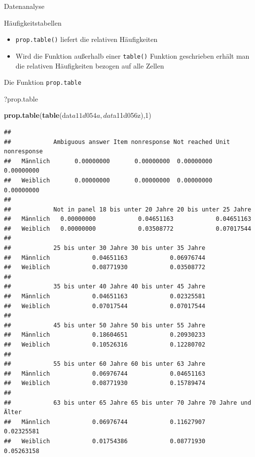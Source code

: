 \documentclass[ignorenonframetext,]{beamer}
\newenvironment{Shaded}{}{}
\newcommand{\KeywordTok}[1]{\textcolor[rgb]{0.00,0.44,0.13}{\textbf{{#1}}}}
\newcommand{\DecValTok}[1]{\textcolor[rgb]{0.25,0.63,0.44}{{#1}}}
\newcommand{\NormalTok}[1]{{#1}}
\providecommand{\tightlist}{%
\setlength{\itemsep}{0pt}\setlength{\parskip}{0pt}}
\begin{document}
\begin{frame}[fragile]{Datenanalyse}
\begin{block}{Häufigkeitstabellen}
\begin{itemize}
\tightlist
\item
  \texttt{prop.table()} liefert die relativen Häufigkeiten
\item
  Wird die Funktion außerhalb einer \texttt{table()} Funktion
  geschrieben erhält man die relativen Häufigkeiten bezogen auf alle
  Zellen
\end{itemize}

\end{block}

\begin{block}{Die Funktion \texttt{prop.table}}

\begin{Shaded}
\begin{Highlighting}[]
\NormalTok{?prop.table}
\end{Highlighting}
\end{Shaded}

\begin{Shaded}
\begin{Highlighting}[]
\KeywordTok{prop.table}\NormalTok{(}\KeywordTok{table}\NormalTok{(dat$a11d054a,dat$a11d056z),}\DecValTok{1}\NormalTok{)}
\end{Highlighting}
\end{Shaded}

\begin{verbatim}
##           
##            Ambiguous answer Item nonresponse Not reached Unit nonresponse
##   Männlich       0.00000000       0.00000000  0.00000000       0.00000000
##   Weiblich       0.00000000       0.00000000  0.00000000       0.00000000
##           
##            Not in panel 18 bis unter 20 Jahre 20 bis unter 25 Jahre
##   Männlich   0.00000000            0.04651163            0.04651163
##   Weiblich   0.00000000            0.03508772            0.07017544
##           
##            25 bis unter 30 Jahre 30 bis unter 35 Jahre
##   Männlich            0.04651163            0.06976744
##   Weiblich            0.08771930            0.03508772
##           
##            35 bis unter 40 Jahre 40 bis unter 45 Jahre
##   Männlich            0.04651163            0.02325581
##   Weiblich            0.07017544            0.07017544
##           
##            45 bis unter 50 Jahre 50 bis unter 55 Jahre
##   Männlich            0.18604651            0.20930233
##   Weiblich            0.10526316            0.12280702
##           
##            55 bis unter 60 Jahre 60 bis unter 63 Jahre
##   Männlich            0.06976744            0.04651163
##   Weiblich            0.08771930            0.15789474
##           
##            63 bis unter 65 Jahre 65 bis unter 70 Jahre 70 Jahre und Älter
##   Männlich            0.06976744            0.11627907         0.02325581
##   Weiblich            0.01754386            0.08771930         0.05263158
\end{verbatim}


\end{block}
\end{frame}
\end{document}
